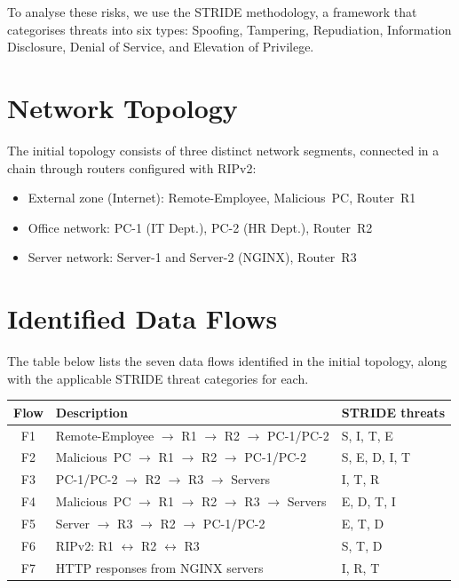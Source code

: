 \documentclass[a4paper,12pt]{article}
\begin{document}
To analyse these risks, we use the STRIDE methodology, a framework that categorises threats into six types: Spoofing, Tampering, Repudiation, Information Disclosure, Denial of Service, and Elevation of Privilege.

\section{Network Topology}

The initial topology consists of three distinct network segments,
connected in a chain through routers configured with RIPv2:

\begin{itemize}
  \item External zone (Internet): Remote-Employee,
        Malicious~PC, Router~R1
  \item Office network: PC-1 (IT Dept.), PC-2 (HR Dept.),
        Router~R2
  \item Server network: Server-1 and Server-2 (NGINX),
        Router~R3
\end{itemize}

\section{Identified Data Flows}

The table below lists the seven data flows identified in the initial
topology, along with the applicable STRIDE threat categories for each.

\begin{center}
\begin{tabularx}{\textwidth}{cXl}
  \toprule
  \textbf{Flow} & \textbf{Description} & \textbf{STRIDE threats} \\
  \midrule
  F1 & Remote-Employee $\to$ R1 $\to$ R2 $\to$ PC-1/PC-2
     & S, I, T, E \\
  F2 & Malicious~PC $\to$ R1 $\to$ R2 $\to$ PC-1/PC-2
     & S, E, D, I, T \\
  F3 & PC-1/PC-2 $\to$ R2 $\to$ R3 $\to$ Servers
     & I, T, R \\
  F4 & Malicious~PC $\to$ R1 $\to$ R2 $\to$ R3 $\to$ Servers
     & E, D, T, I \\
  F5 & Server $\to$ R3 $\to$ R2 $\to$ PC-1/PC-2
     & E, T, D \\
  F6 & RIPv2: R1 $\leftrightarrow$ R2 $\leftrightarrow$ R3
     & S, T, D \\
  F7 & HTTP responses from NGINX servers
     & I, R, T \\
  \bottomrule
\end{tabularx}
\end{center}
\end{document}
